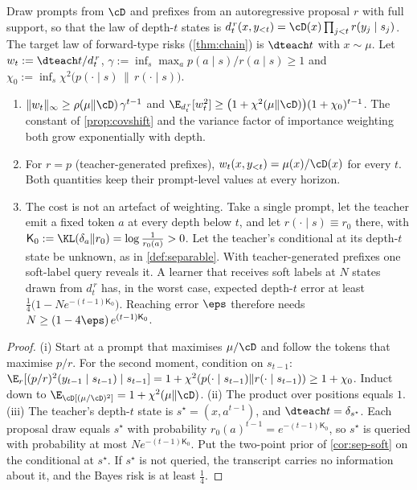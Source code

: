 \begin{proposition}\label{prop:path-shift}
\Pv\Ck Draw prompts from $\cD$ and prefixes from an autoregressive proposal $r$ with full support, so that the
law of depth-$t$ states is $d^{\,r}_t(x,y_{<t})=\cD(x)\prod_{j<t}r(y_j\mid s_j)$. The target law of forward-type risks
(\cref{thm:chain}) is $\dteach t$ with $x\sim\mu$. Let $w_t:=\dteach t/d^{\,r}_t$,
$\gamma:=\inf_s\max_ap(a\mid s)/r(a\mid s)\ge1$ and $\chi_0:=\inf_s\chi^2\big(p(\cdot\mid s)\,\|\,r(\cdot\mid s)\big)$.
\begin{enumerate}[label=(\roman*),nosep]
\item $\|w_t\|_\infty\ge\rho(\mu\|\cD)\,\gamma^{t-1}$ and $\E_{d^{\,r}_t}[w_t^2]\ge\big(1+\chi^2(\mu\|\cD)\big)(1+\chi_0)^{t-1}$. The constant
of \cref{prop:covshift} and the variance factor of importance weighting both grow exponentially with
depth.
\item For $r=p$ (teacher-generated prefixes), $w_t(x,y_{<t})=\mu(x)/\cD(x)$ for every $t$. Both quantities
keep their prompt-level values at every horizon.
\item The cost is not an artefact of weighting. Take a single prompt, let the teacher emit a fixed token $a$
at every depth below $t$, and let $r(\cdot\mid s)\equiv r_0$ there, with $\mathsf K_0:=\KL(\delta_a\|r_0)=\log\frac1{r_0(a)}>0$. Let
the teacher's conditional at its depth-$t$ state be unknown, as in \cref{def:separable}. With
teacher-generated prefixes one soft-label query reveals it. A learner that receives soft labels at $N$
states drawn from $d^{\,r}_t$ has, in the worst case, expected depth-$t$ error at least
$\frac14\big(1-Ne^{-(t-1)\mathsf K_0}\big)$. Reaching error $\eps$ therefore needs $N\ge(1-4\eps)\,e^{(t-1)\mathsf K_0}$.
\end{enumerate}
\end{proposition}
\begin{proof}
(i) Start at a prompt that maximises $\mu/\cD$ and follow the tokens that maximise $p/r$. For the second
moment, condition on $s_{t-1}$:
$\E_r[(p/r)^2(y_{t-1}\mid s_{t-1})\mid s_{t-1}]=1+\chi^2(p(\cdot\mid s_{t-1})\|r(\cdot\mid s_{t-1}))\ge1+\chi_0$. Induct down to
$\E_\cD[(\mu/\cD)^2]=1+\chi^2(\mu\|\cD)$.
(ii) The product over positions equals $1$.
(iii) The teacher's depth-$t$ state is $s^\star=(x,a^{t-1})$, and $\dteach t=\delta_{s^\star}$. Each proposal draw equals $s^\star$
with probability $r_0(a)^{t-1}=e^{-(t-1)\mathsf K_0}$, so $s^\star$ is queried with probability at most $Ne^{-(t-1)\mathsf K_0}$.
Put the two-point prior of \cref{cor:sep-soft} on the conditional at $s^\star$. If $s^\star$ is not queried, the
transcript carries no information about it, and the Bayes risk is at least $\frac14$.
\end{proof}

